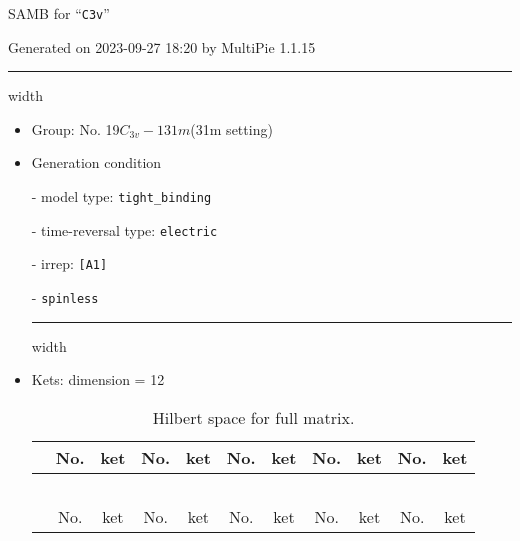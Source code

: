 \documentclass[fleqn,10pt,landscape]{article}
\begin{document}
\setcounter{MaxMatrixCols}{16}

\setlength{\baselineskip}{16pt}
\footnotesize
\begin{center}
\LARGE
SAMB for ``\texttt{C3v}''
\end{center}
\begin{flushright}
Generated on 2023-09-27 18:20 by MultiPie 1.1.15
\end{flushright}
\vspace{1cm}


 \hfil \hrule height 1mm width \textwidth \hfil

\begin{itemize}
\item Group: No. 19\quad$C_{3v}-1$\quad$31m$\quad(31m setting)\quad[ trigonal ]

\vspace{5mm}

\item Generation condition

\quad - model type: \texttt{tight_binding}

\quad - time-reversal type: \texttt{electric}

\quad - irrep: \texttt{[A1]}

\quad - \texttt{spinless}


 \hfil \hrule height 1mm width \textwidth \hfil

\item Kets: dimension = 12
\begin{center}
\renewcommand{\arraystretch}{1.3}
\begin{longtable}{c|cc|cc|cc|cc|cc}
\caption{Hilbert space for full matrix.}
 \\
 \hline \hline
 & No. & ket & No. & ket & No. & ket & No. & ket & No. & ket \\ \hline \endfirsthead

\multicolumn{10}{l}{\tablename\ \thetable{}} \\
 \hline \hline
 & No. & ket & No. & ket & No. & ket & No. & ket & No. & ket \\ \hline \endhead


\end{longtable}
\end{center}
\end{itemize}
\end{document}

